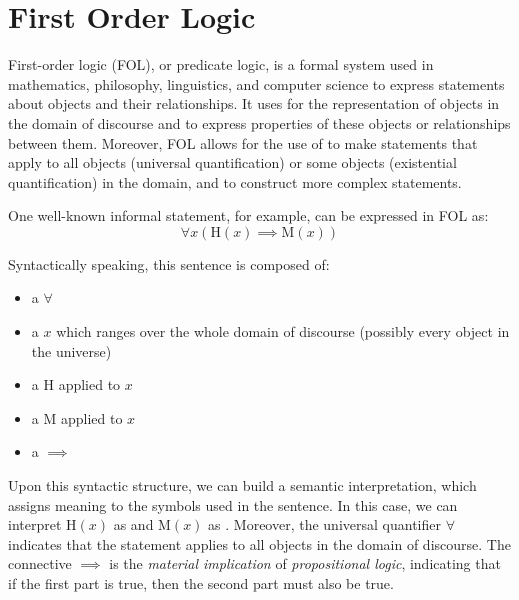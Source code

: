 \chapter{First Order Logic}\label{chap:first-order-logic}


\noindent First-order logic (FOL), or predicate logic, is a formal system used in mathematics, philosophy, linguistics, and computer science to express statements about objects and their relationships.
It uses  for the representation of objects in the domain of discourse and  to express properties of these objects or relationships between them.
Moreover, FOL allows for the use of  to make statements that apply to all objects (universal quantification) or some objects (existential quantification) in the domain, and  to construct more complex statements.

One well-known informal statement,  for example, can be expressed in FOL as:
\begin{equation*}
    \forall x \left( \text{H}(x) \implies \text{M}(x) \right)
\end{equation*}

Syntactically speaking, this sentence is composed of:
\begin{itemize}
    \item a  \(\forall\)
    \item a  \(x\) which ranges over the whole domain of discourse (possibly every object in the universe)
    \item a  \(\text{H}\) applied to \(x\)
    \item a  \(\text{M}\) applied to \(x\)
    \item a  \(\implies\)
\end{itemize}

Upon this syntactic structure, we can build a semantic interpretation, which assigns meaning to the symbols used in the sentence.
In this case, we can interpret \(\text{H}(x)\) as  and \(\text{M}(x)\) as .
Moreover, the universal quantifier \(\forall\) indicates that the statement applies to all objects in the domain of discourse.
The connective \(\implies\) is the \emph{material implication} of \emph{propositional logic}, indicating that if the first part is true, then the second part must also be true.

